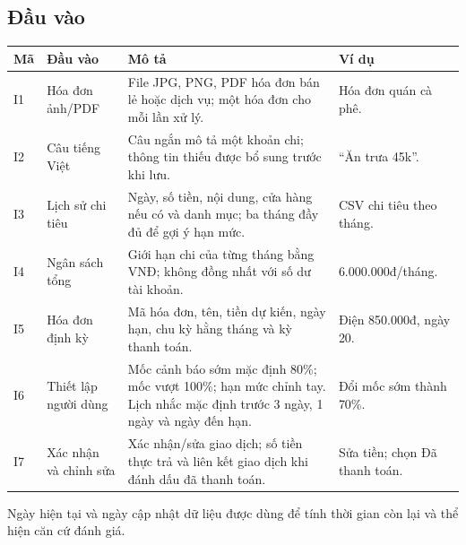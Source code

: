 \documentclass[11pt,a4paper]{article}
\newcommand{\thead}[1]{\rowcolor{tablehead}#1\\\midrule}
\begin{document}
\subsection{Đầu vào}
\begin{longtable}{@{}P{.7cm}P{3.3cm}P{7.1cm}P{4cm}@{}}
\toprule\thead{\textbf{Mã}&\textbf{Đầu vào}&\textbf{Mô tả}&\textbf{Ví dụ}}
\endhead
I1&Hóa đơn ảnh/PDF&File JPG, PNG, PDF hóa đơn bán lẻ hoặc dịch vụ; một hóa đơn cho mỗi lần xử lý.&Hóa đơn quán cà phê.\\\midrule
I2&Câu tiếng Việt&Câu ngắn mô tả một khoản chi; thông tin thiếu được bổ sung trước khi lưu.&``Ăn trưa 45k''.\\\midrule
I3&Lịch sử chi tiêu&Ngày, số tiền, nội dung, cửa hàng nếu có và danh mục; ba tháng đầy đủ để gợi ý hạn mức.&CSV chi tiêu theo tháng.\\\midrule
I4&Ngân sách tổng&Giới hạn chi của từng tháng bằng VNĐ; không đồng nhất với số dư tài khoản.&6.000.000đ/tháng.\\\midrule
I5&Hóa đơn định kỳ&Mã hóa đơn, tên, tiền dự kiến, ngày hạn, chu kỳ hằng tháng và kỳ thanh toán.&Điện 850.000đ, ngày 20.\\\midrule
I6&Thiết lập người dùng&Mốc cảnh báo sớm mặc định 80\%; mốc vượt 100\%; hạn mức chỉnh tay. Lịch nhắc mặc định trước 3 ngày, 1 ngày và ngày đến hạn.&Đổi mốc sớm thành 70\%.\\\midrule
I7&Xác nhận và chỉnh sửa&Xác nhận/sửa giao dịch; số tiền thực trả và liên kết giao dịch khi đánh dấu đã thanh toán.&Sửa tiền; chọn Đã thanh toán.\\\bottomrule
\end{longtable}
Ngày hiện tại và ngày cập nhật dữ liệu được dùng để tính thời gian còn lại và thể hiện căn cứ đánh giá.
\end{document}
